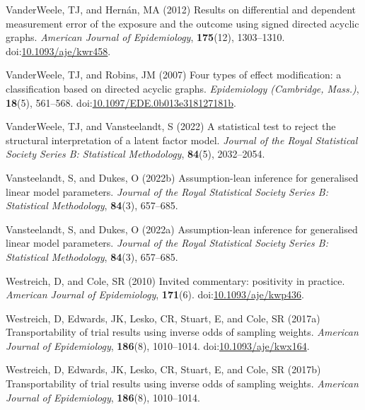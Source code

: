 \documentclass[
  single column]{article}
\newlength{\cslhangindent}
\newenvironment{CSLReferences}[2] %
 {\begin{list}{}{%
  \setlength{\itemindent}{0pt}
  \setlength{\leftmargin}{0pt}
  \setlength{\parsep}{0pt}
  \ifodd #1
   \setlength{\leftmargin}{\cslhangindent}
   \setlength{\itemindent}{-1\cslhangindent}
  \fi
  \setlength{\itemsep}{#2\baselineskip}}}
 {\end{list}}
\begin{document}
\begin{CSLReferences}{1}{0}
VanderWeele, TJ, and Hernán, MA (2012) Results on differential and
dependent measurement error of the exposure and the outcome using signed
directed acyclic graphs. \emph{American Journal of Epidemiology},
\textbf{175}(12), 1303--1310.
doi:\href{https://doi.org/10.1093/aje/kwr458}{10.1093/aje/kwr458}.

VanderWeele, TJ, and Robins, JM (2007) Four types of effect
modification: a classification based on directed acyclic graphs.
\emph{Epidemiology (Cambridge, Mass.)}, \textbf{18}(5), 561--568.
doi:\href{https://doi.org/10.1097/EDE.0b013e318127181b}{10.1097/EDE.0b013e318127181b}.

VanderWeele, TJ, and Vansteelandt, S (2022) A statistical test to reject
the structural interpretation of a latent factor model. \emph{Journal of
the Royal Statistical Society Series B: Statistical Methodology},
\textbf{84}(5), 2032--2054.

Vansteelandt, S, and Dukes, O (2022b) Assumption-lean inference for
generalised linear model parameters. \emph{Journal of the Royal
Statistical Society Series B: Statistical Methodology}, \textbf{84}(3),
657--685.

Vansteelandt, S, and Dukes, O (2022a) Assumption-lean inference for
generalised linear model parameters. \emph{Journal of the Royal
Statistical Society Series B: Statistical Methodology}, \textbf{84}(3),
657--685.

Westreich, D, and Cole, SR (2010) Invited commentary: positivity in
practice. \emph{American Journal of Epidemiology}, \textbf{171}(6).
doi:\href{https://doi.org/10.1093/aje/kwp436}{10.1093/aje/kwp436}.

Westreich, D, Edwards, JK, Lesko, CR, Stuart, E, and Cole, SR (2017a)
Transportability of trial results using inverse odds of sampling
weights. \emph{American Journal of Epidemiology}, \textbf{186}(8),
1010--1014.
doi:\href{https://doi.org/10.1093/aje/kwx164}{10.1093/aje/kwx164}.

Westreich, D, Edwards, JK, Lesko, CR, Stuart, E, and Cole, SR (2017b)
Transportability of trial results using inverse odds of sampling
weights. \emph{American Journal of Epidemiology}, \textbf{186}(8),
1010--1014.

\end{CSLReferences}
\end{document}
